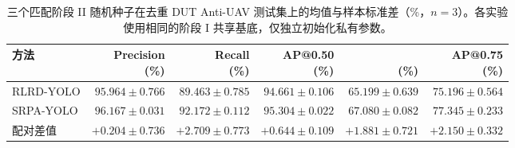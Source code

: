 \begin{table}[!t]
\caption{三个匹配阶段 II 随机种子在去重 DUT Anti-UAV 测试集上的均值与样本标准差（\%，$n=3$）。各实验使用相同的阶段 I 共享基底，仅独立初始化私有参数。\label{tab:seeds}}
\centering\srpatablesetup
\begin{tabular}{lrrrrr}\toprule
方法 & \shortstack{Precision\\(\%)} & \shortstack{Recall\\(\%)} & \shortstack{AP@0.50\\(\%)} & \shortstack{\mapall{}\\(\%)} & \shortstack{AP@0.75\\(\%)}\\\midrule
RLRD-YOLO & $95.964\pm0.766$ & $89.463\pm0.785$ & $94.661\pm0.106$ & $65.199\pm0.639$ & $75.196\pm0.564$\\
SRPA-YOLO & $96.167\pm0.031$ & $92.172\pm0.112$ & $95.304\pm0.022$ & $67.080\pm0.082$ & $77.345\pm0.233$\\
配对差值 & $+0.204\pm0.736$ & $+2.709\pm0.773$ & $+0.644\pm0.109$ & $+1.881\pm0.721$ & $+2.150\pm0.332$\\\bottomrule
\end{tabular}
\end{table}
